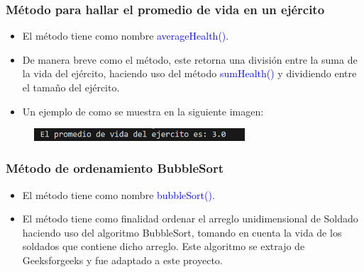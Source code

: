 \documentclass{article}
\begin{document}
        \subsubsection{Método para hallar el promedio de vida en un ejército}

        \begin{itemize}
            \item El método tiene como nombre \textcolor{blue}{averageHealth()}.
            \item De manera breve como el método, este retorna una división entre la suma de la vida del ejército, haciendo uso del método \textcolor{blue}{sumHealth()} y dividiendo entre el tamaño del ejército.
        \end{itemize}

        

        \begin{itemize}
            \begin{itemize}
                \item Un ejemplo de como se muestra en la siguiente imagen:
            \end{itemize}
        \end{itemize}

        \begin{figure}[H]
            \centering
            \includegraphics[width=0.7\textwidth,keepaspectratio]{img/averageHealth.png}
            \caption{}
        \end{figure}
        
        \newpage
        \subsubsection{Método de ordenamiento BubbleSort}

        \begin{itemize}
            \item El método tiene como nombre \textcolor{blue}{bubbleSort()}.
            \item El método tiene como finalidad ordenar el arreglo unidimensional de Soldado haciendo uso del algoritmo BubbleSort, tomando en cuenta la vida de los soldados que contiene dicho arreglo. Este algoritmo se extrajo de Geeksforgeeks y fue adaptado a este proyecto.
        \end{itemize}
\end{document}
